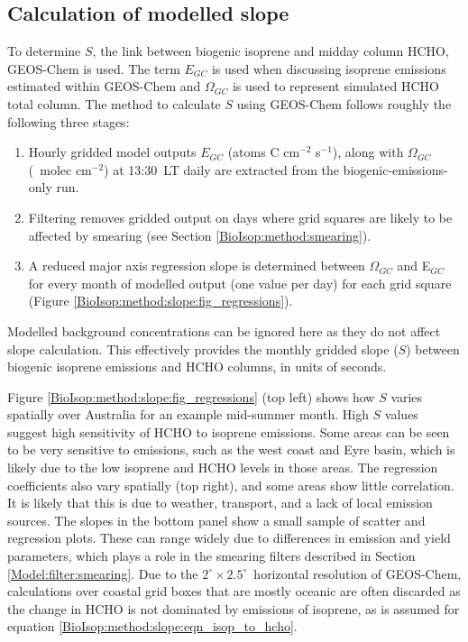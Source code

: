 \documentclass[acp, manuscript]{copernicus}
\newcommand{\Ogc}{\Omega_{GC}}  %
\newcommand{\apri}{E_{GC}} %
\newcommand{\moleccm}{~molec cm$^{-2}$}
\newcommand{\lowhr}{$2^{\circ} \times 2.5^{\circ}$}
\begin{document}
  \subsection{Calculation of modelled slope}
    \label{BioIsop:method:slope_calc}
    
    To determine $S$, the link between biogenic isoprene and midday column HCHO, GEOS-Chem is used.
    The term $\apri$ is used when discussing isoprene emissions estimated within GEOS-Chem and $\Ogc$ is used to represent simulated HCHO total column.
    The method to calculate $S$ using GEOS-Chem follows roughly the following three stages: 
    \begin{enumerate}
      \item 
      Hourly gridded model outputs $\apri$ (atoms C cm$^{-2}$ s$^{-1}$), along with $\Ogc$ (\moleccm) at 13:30~LT daily are extracted from the biogenic-emissions-only run.
      \item
      Filtering removes gridded output on days where grid squares are likely to be affected by smearing (see Section \ref{BioIsop:method:smearing}).
      \item 
      A reduced major axis regression slope is determined between $\Ogc$ and E$_{GC}$ for every month of modelled output (one value per day) for each grid square (Figure \ref{BioIsop:method:slope:fig_regressions}).
    \end{enumerate}
    Modelled background concentrations can be ignored here as they do not affect slope calculation.
    This effectively provides the monthly gridded slope ($S$) between biogenic isoprene emissions and HCHO columns, in units of seconds.
    
    
    Figure \ref{BioIsop:method:slope:fig_regressions} (top left) shows how $S$ varies spatially over Australia for an example mid-summer month.
    High $S$ values suggest high sensitivity of HCHO to isoprene emissions.
    Some areas can be seen to be very sensitive to emissions, such as the west coast and Eyre basin, which is likely due to the low isoprene and HCHO levels in those areas.
    The regression coefficients also vary spatially (top right), and some areas show little correlation.
    It is likely that this is due to weather, transport, and a lack of local emission sources.
    The slopes in the bottom panel show a small sample of scatter and regression plots. 
    These can range widely due to differences in emission and yield parameters, which plays a role in the smearing filters described in Section \ref{Model:filter:smearing}.
    Due to the \lowhr ~horizontal resolution of GEOS-Chem, calculations over coastal grid boxes that are mostly oceanic are often discarded as the change in HCHO is not dominated by emissions of isoprene, as is assumed for equation \ref{BioIsop:method:slope:eqn_isop_to_hcho}.
    
\end{document}
